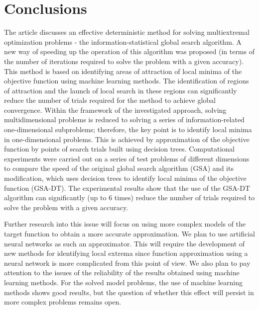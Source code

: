 \documentclass[entropy,article,submit,moreauthors,pdftex]{Definitions/mdpi}
\begin{document}
\section{Conclusions}

The article discusses an effective deterministic method for solving multiextremal optimization problems - the information-statistical global search algorithm.
A new way of speeding up the operation of this algorithm was proposed (in terms of the number of iterations required to solve the problem with a given accuracy). This method is based on identifying areas of attraction of local minima of the objective function using machine learning methods. The identification of regions of attraction and the launch of local search in these regions can significantly reduce the number of trials required for the method to achieve global convergence. 
Within the framework of the investigated approach, solving multidimensional problems is reduced to solving a series of information-related one-dimensional subproblems; therefore, the key point is to identify local minima in one-dimensional problems. This is achieved by approximation of the objective function by points of search trials built using decision trees. 
Computational experiments were carried out on a series of test problems of different dimensions to compare the speed of the original global search algorithm (GSA) and its modification, which uses decision trees to identify local minima of the objective function (GSA-DT). 
The experimental results show that the use of the GSA-DT algorithm can significantly (up to 6 times) reduce the number of trials required to solve the problem with a given accuracy.

Further research into this issue will focus on using more complex models of the target function to obtain a more accurate approximation. We plan to use artificial neural networks as such an approximator. This will require the development of new methods for identifying local extrema since function approximation using a neural network is more complicated from this point of view. We also plan to pay attention to the issues of the reliability of the results obtained using machine learning methods. For the solved model problems, the use of machine learning methods shows good results, but the question of whether this effect will persist in more complex problems remains open.



\end{document}
